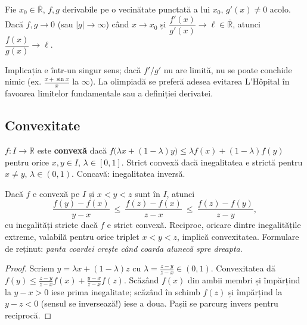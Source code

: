 \begin{teorema}[L'Hôpital]
Fie $x_0\in\overline{\mathbb{R}}$, $f,g$ derivabile pe o vecinătate punctată a lui $x_0$, $g'(x) \neq 0$ acolo. Dacă $f,g\to 0$ (sau $|g|\to\infty$) când $x\to x_0$ și $\dfrac{f'(x)}{g'(x)}\to\ell\in\overline{\mathbb{R}}$, atunci $\dfrac{f(x)}{g(x)}\to\ell$.
\end{teorema}

\begin{obs}
Implicația e într-un singur sens; dacă $f'/g'$ nu are limită, nu se poate conchide nimic (ex. $\frac{x+\sin x}{x}$ la $\infty$). La olimpiadă se preferă adesea evitarea L'Hôpital în favoarea limitelor fundamentale sau a definiției derivatei.
\end{obs}



\subsection{Convexitate}

\begin{definitie}
$f:I\to\mathbb{R}$ este \textbf{convexă} dacă $f\big(\lambda x+(1-\lambda)y\big)\le \lambda f(x)+(1-\lambda)f(y)$ pentru orice $x,y\in I$, $\lambda\in[0,1]$. Strict convexă dacă inegalitatea e strictă pentru $x \neq y$, $\lambda\in(0,1)$. Concavă: inegalitatea inversă.
\end{definitie}

\begin{lema}
Dacă $f$ e convexă pe $I$ și $x<y<z$ sunt în $I$, atunci
\[
\frac{f(y)-f(x)}{y-x}\ \le\ \frac{f(z)-f(x)}{z-x}\ \le\ \frac{f(z)-f(y)}{z-y},
\]
cu inegalități stricte dacă $f$ e strict convexă. Reciproc, oricare dintre inegalitățile extreme, valabilă pentru orice triplet $x<y<z$, implică convexitatea. Formulare de reținut: \emph{panta coardei crește când coarda alunecă spre dreapta}.
\end{lema}
\begin{proof}
Scriem $y=\lambda x+(1-\lambda)z$ cu $\lambda=\frac{z-y}{z-x}\in(0,1)$. Convexitatea dă
$f(y)\le\frac{z-y}{z-x}f(x)+\frac{y-x}{z-x}f(z)$.
Scăzând $f(x)$ din ambii membri și împărțind la $y-x>0$ iese prima inegalitate; scăzând în schimb $f(z)$ și împărțind la $y-z<0$ (sensul se inversează!) iese a doua. Pașii se parcurg invers pentru reciprocă.
\end{proof}

